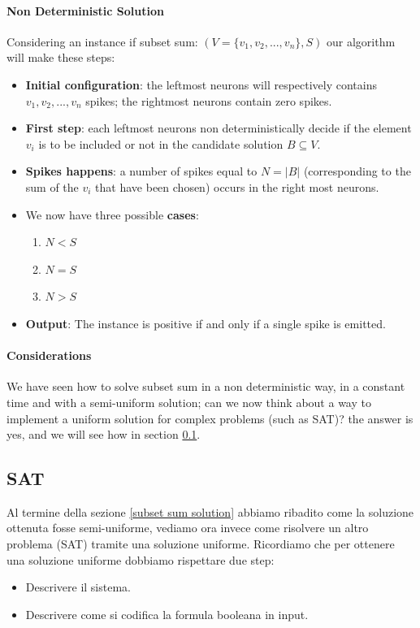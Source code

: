 \documentclass[12pt,a4paper]{report}
\begin{document}
\paragraph{Non Deterministic Solution}
Considering an instance if subset sum: $ (V = \lbrace v_{1}, v_{2}, ..., v_{n} \rbrace, S) $ our algorithm will make these steps:
\begin{itemize}
\item \textbf{Initial configuration}: the leftmost neurons will respectively contains $v_{1}, v_{2}, ..., v_{n}$ spikes; the rightmost neurons contain zero spikes.
\item \textbf{First step}: each leftmost neurons non deterministically decide if the element $v_{i}$ is to be included or not in the candidate solution $B \subseteq V$.
\item \textbf{Spikes happens}: a number of spikes equal to $N = |B|$ (corresponding to the sum of the $v_{i}$ that have been chosen) occurs in the right most neurons.
\item We now have three possible \textbf{cases}:
\begin{enumerate}
\item $ N < S $
\item $ N = S $
\item $ N > S $
\end{enumerate}
\item \textbf{Output}: The instance is positive if and only if a single spike is emitted.
\end{itemize}
\paragraph{Considerations}
We have seen how to solve subset sum in a non deterministic way, in a constant time and with a semi-uniform solution; can we now think about a way to implement a uniform solution for complex problems (such as SAT)? the answer is yes, and we will see how in section \ref{SAT solution}.

\subsection{SAT}
\label{SAT solution}
Al termine della sezione \ref{subset sum solution} abbiamo ribadito come la soluzione ottenuta fosse semi-uniforme, vediamo ora invece come risolvere un altro problema (SAT) tramite una soluzione uniforme.
Ricordiamo che per ottenere una soluzione uniforme dobbiamo rispettare due step:
\begin{itemize}
\item Descrivere il sistema.
\item Descrivere come si codifica la formula booleana in input.
\end{itemize}
\end{document}
